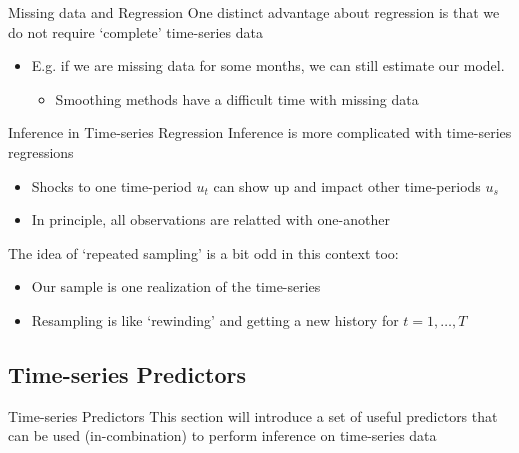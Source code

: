 \documentclass[aspectratio=169,t,11pt,table]{beamer}
\begin{document}
\begin{frame}{Missing data and Regression}
  One distinct advantage about regression is that we do not require `complete' time-series data
  \begin{itemize}
    \item E.g. if we are missing data for some months, we can still estimate our model. 
    \begin{itemize}
      \item Smoothing methods have a difficult time with missing data
    \end{itemize}
  \end{itemize}
\end{frame}

\begin{frame}{Inference in Time-series Regression}
  Inference is more complicated with time-series regressions
  
  \begin{itemize}
    \item Shocks to one time-period $u_t$ can show up and impact other time-periods $u_s$
    \item In principle, all observations are relatted with one-another
  \end{itemize}

  \pause
  \bigskip\medskip
  The idea of `repeated sampling' is a bit odd in this context too:
  \begin{itemize}
    \item Our sample is one realization of the time-series
    
    \item Resampling is like `rewinding' and getting a new history for $t = 1, \dots, T$
  \end{itemize}
\end{frame}

\subsection{Time-series Predictors}

\begin{frame}{Time-series Predictors}
  This section will introduce a set of useful predictors that can be used (in-combination) to perform inference on time-series data
\end{frame}

\end{document}
